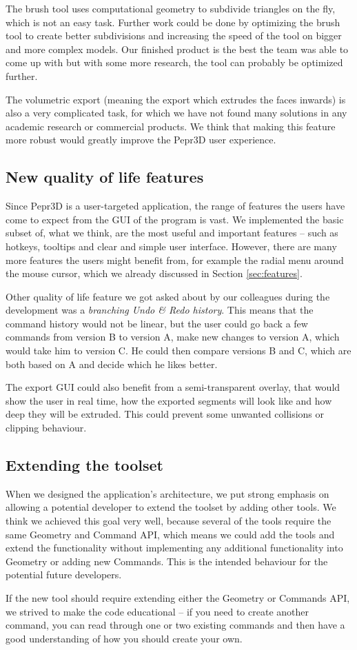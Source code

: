 The brush tool uses computational geometry to subdivide triangles on the fly, which is not an easy task. Further work could be done by optimizing the brush tool to create better subdivisions and increasing the speed of the tool on bigger and more complex models. Our finished product is the best the team was able to come up with but with some more research, the tool can probably be optimized further.

The volumetric export (meaning the export which extrudes the faces inwards) is also a very complicated task, for which we have not found many solutions in any academic research or commercial products. We think that making this feature more robust would greatly improve the Pepr3D user experience.

\subsection{New quality of life features}

Since Pepr3D is a user-targeted application, the range of features the users have come to expect from the GUI of the program is vast. We implemented the basic subset of, what we think, are the most useful and important features -- such as hotkeys, tooltips and clear and simple user interface. However, there are many more features the users might benefit from, for example the radial menu around the mouse cursor, which we already discussed in Section \ref{sec:features}.

Other quality of life feature we got asked about by our colleagues during the development was a \textit{branching Undo \& Redo history}. This means that the command history would not be linear, but the user could go back a few commands from version B to version A, make new changes to version A, which would take him to version C. He could then compare versions B and C, which are both based on A and decide which he likes better.

The export GUI could also benefit from a semi-transparent overlay, that would show the user in real time, how the exported segments will look like and how deep they will be extruded. This could prevent some unwanted collisions or clipping behaviour.

\subsection{Extending the toolset}

When we designed the application's architecture, we put strong emphasis on allowing a potential developer to extend the toolset by adding other tools. We think we achieved this goal very well, because several of the tools require the same Geometry and Command API, which means we could add the tools and extend the functionality without implementing any additional functionality into Geometry or adding new Commands. This is the intended behaviour for the potential future developers.

If the new tool should require extending either the Geometry or Commands API, we strived to make the code educational -- if you need to create another command, you can read through one or two existing commands and then have a good understanding of how you should create your own.